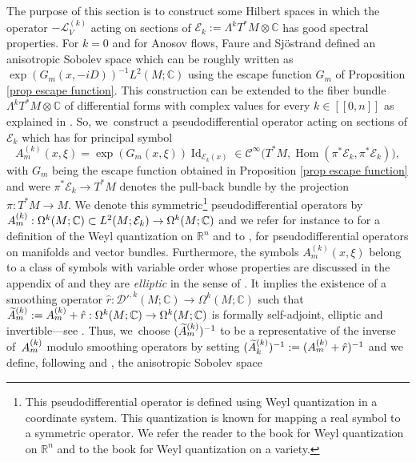 \documentclass[11pt]{article}
\newcommand{\lcr}{[\![}
\newcommand{\rcr}{]\!]}
\theoremstyle{definition}
\theoremstyle{plain}
\newcommand{\A}{\emph{A}}
\newcommand{\Ccal}{\mathcal{C}}
\newcommand{\C}{\mathbb{C}}
\newcommand{\D}{\mathcal{D}}
\newcommand{\Ecal}{\mathcal{E}}
\newcommand{\Lie}{\mathcal{L}}
\newcommand{\R}{\mathbb{R}}
\DeclareMathOperator{\Id}{Id}
\DeclareMathOperator{\Hom}{Hom}
\begin{document}
The purpose of this section is to construct some Hilbert spaces in which the operator $-\Lie_V^{(k)}$ acting on sections of $\Ecal_k:= \Lambda^k T^*M \otimes \C$ has good spectral properties. For $k = 0$ and for Anosov flows, Faure and Sjöstrand defined an anisotropic Sobolev space which can be roughly written as $\exp (G_m (x,-iD))^{-1} L^2 (M ; \C)$ using the escape function $G_m$ of Proposition \ref{prop escape function}. This construction can be extended to the fiber bundle $ \Lambda^k T^*M \otimes \C$ of differential forms with complex values for every $k\in\lcr0,n\rcr$ as explained in \cite{dyatlov-zworski}. So, we~construct a pseudodifferential operator acting on sections of $\Ecal_k$ which has for principal symbol\enlargethispage{\baselineskip}
\[
A_m^{(k)} (x,\xi) = \exp (G_m (x,\xi))\Id_{\Ecal_k (x)} \in \Ccal^{\infty} \bigl(T^*M, \Hom (\pi^* \Ecal_k, \pi^* \Ecal_k) \bigr),
\]
with $G_m$ being the escape function obtained in Proposition \ref{prop escape function} and were $\pi^* \Ecal_k \to T^* M$ denotes the pull-back bundle by the projection $\pi: T^* M \to M$. We denote this symmetric\footnote{This pseudodifferential operator is defined using Weyl quantization in a coordinate system. This quantization is known for mapping a real symbol to a symmetric operator. We refer the reader to the book \cite[Chap.\,4, Th.\,4.1]{zworski} for Weyl quantization on $\R^n$ and to the book \cite[App.\,E]{DZ-book} for Weyl quantization on a variety.} pseudodifferential operators by $\A_m^{(k)}: \Omega^k (M ; \C) \subset L^2 (M; \Ecal_k) \to \Omega^k (M ; \C) $ and we refer for instance to \cite[Chap.\,4, p.\,56]{zworski} for a definition of the Weyl quantization on $\R^n$ and to \cite[App.\,C.1, p.\,29]{dyatlov-zworski},\cite[\S 9.2 p.\,40]{DRI} for pseudodifferential operators on manifolds and vector bundles. Furthermore, the symbols $A_m^{(k)} (x,\xi) $ belong to a class of symbols with variable order whose properties are discussed in the appendix of \cite{FRS} and they are \emph{elliptic} in the sense of \cite[Def.\,8, p.\,40]{FRS}. It implies the existence of a smoothing operator $\hat{r}: \D'^{,k} (M;\C) \to \Omega^k (M; \C)$ such that $\widetilde{\A}{}_m^{(k)}:= \A_m^{(k)} + \hat{r}: \Omega^k (M; \C) \to \Omega^k (M; \C)$ is formally self-adjoint, elliptic and invertible---see \cite[Lem.\,12, p.\,42]{FRS}. Thus, we~choose $(\widetilde{\A}{}_m^{(k)})^{-1}$ to be a representative of the inverse of~$\A_m^{(k)}$ modulo smoothing operators by setting $(\widetilde{\A}{}_k^{(k)})^{-1}:= (\A_m^{(k)} + \hat{r})^{-1}$ and we define, following \cite{FRS} and \cite{FS}, the anisotropic Sobolev space
\end{document}
